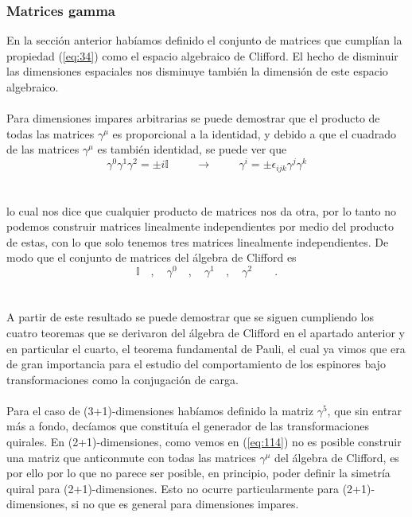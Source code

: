 \documentclass[11pt,letterpaper]{article}     %
\begin{document}
\subsubsection{Matrices gamma}




En la sección anterior habíamos definido el conjunto de matrices que cumplían la propiedad (\ref{eq:34}) como el espacio algebraico de Clifford. El hecho de disminuir las dimensiones espaciales nos disminuye también la dimensión de este espacio algebraico. \\ \\
Para dimensiones impares arbitrarias se puede demostrar que el producto de todas las matrices $\gamma^\mu$ es proporcional a la identidad, y debido a que el cuadrado de las matrices $\gamma^\mu$ es también identidad, se puede ver que \\
\begin{equation} \label{eq:118}
\gamma^0\gamma^1\gamma^2=\pm i \mathbb{I} \hspace{1cm} \rightarrow \hspace{1cm} \gamma^i=\pm\epsilon_{ijk}\gamma^j \gamma^k
\end{equation} \\ \\
lo cual nos dice que cualquier producto de matrices nos da otra, por lo tanto no podemos construir  matrices linealmente independientes por medio del producto de estas, con lo que solo tenemos tres matrices linealmente independientes. De modo que el conjunto de matrices del álgebra de Clifford es \\
\begin{equation} \label{eq:119}
\mathbb{I} \quad , \quad \gamma^0 \quad , \quad \gamma^1 \quad , \quad \gamma^2 \qquad .
\end{equation} \\ \\
A partir de este resultado se puede demostrar que se siguen cumpliendo los cuatro teoremas que se derivaron del álgebra de Clifford en el apartado anterior y en particular el cuarto, el teorema fundamental de Pauli, el cual ya vimos que era de gran importancia para el estudio del comportamiento de los espinores bajo transformaciones como la conjugación de carga. \\ \\
Para el caso de (3+1)-dimensiones habíamos definido la matriz $\gamma^5$, que sin entrar más a fondo, decíamos que constituía el generador de las transformaciones quirales. En (2+1)-dimensiones, como vemos en (\ref{eq:114}) no es posible construir una matriz que anticonmute con todas las matrices $\gamma^\mu$ del álgebra de Clifford, es por ello por lo que no parece ser posible, en principio, poder definir la simetría quiral para (2+1)-dimensiones. Esto no ocurre particularmente para (2+1)-dimensiones, si no que es general para dimensiones impares.
\end{document}
